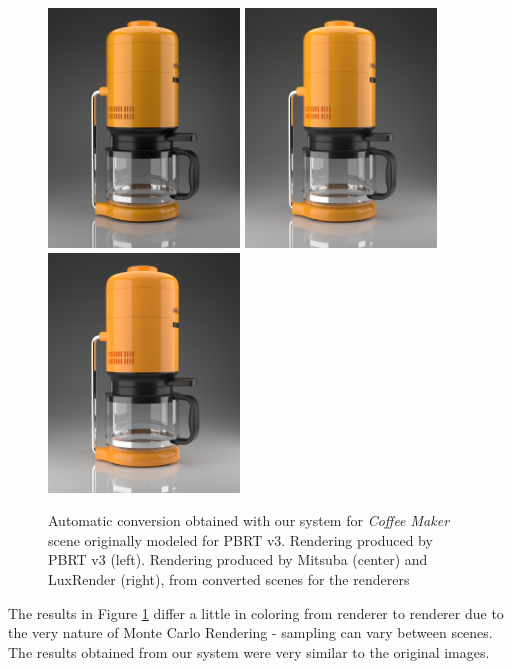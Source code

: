 \begin{figure}
\centering
\includegraphics[width=2in]{figs/4_results/coffee/1_from_pbrt.png}
\includegraphics[width=2in]{figs/4_results/coffee/2_to_mitsuba.png}
\includegraphics[width=2in]{figs/4_results/coffee/3_to_lux.png}
\caption{Automatic conversion obtained with our system for \textit{Coffee Maker}
scene originally modeled for PBRT v3. Rendering produced by PBRT v3 (left).
Rendering produced by Mitsuba (center) and LuxRender (right),
from converted scenes for the renderers}
\label{fig:staircase}
\end{figure}




The results in Figure \ref{fig:staircase} differ a little in coloring from 
renderer to renderer due to the very nature of Monte Carlo Rendering - sampling 
can vary between scenes. The results obtained from our system were very similar 
to the original images.



